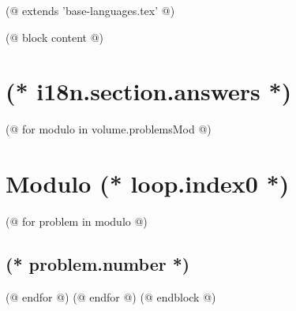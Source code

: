 (@ extends 'base-languages.tex' @)

(@ block content @)
    \pagestyle{main}
    \thispagestyle{first}
    \vspace*{19mm}
   
    \section{(* i18n.section.answers *)}
    \pagestyle{answers}
    (@ for modulo in volume.problemsMod @)
        \newpage%
        \section{Modulo (* loop.index0 *)}
        (@ for problem in modulo @)%
            \setcounter{volume}{(* volume.number *)}%
            \setcounter{problem}{(* problem.number *)}%
            \subsection{(* problem.number *)}%
        (@ endfor @)
    (@ endfor @)
(@ endblock @)    
